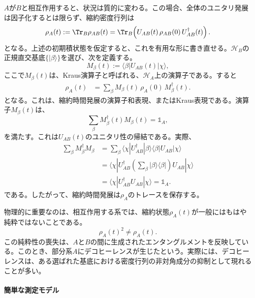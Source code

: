\documentclass[a4paper,11pt,oneside]{article}
\theoremstyle{definition}
\numberwithin{equation}{section}
\begin{document}
$A$が$B$と相互作用すると、状況は質的に変わる。この場合、全体のユニタリ発展は因子化するとは限らず、縮約密度行列は
\begin{equation}
\rho_A(t)
:=
\Tr_B \rho_{AB}(t)
=
\Tr_B\!\left(U_{AB}(t)\,\rho_{AB}(0)\,U_{AB}^\dagger(t)\right) .
\end{equation}
となる。上述の初期積状態を仮定すると、これを有用な形に書き直せる。$\mathcal H_B$の正規直交基底$\{|\beta\rangle\}$を選び、次を定義する。
\begin{equation}\label{def:kraus}
M_\beta(t) := \langle \beta|U_{AB}(t)|\chi\rangle ,
\end{equation}
ここで$M_\beta(t)$は、Kraus演算子と呼ばれる、$\mathcal H_A$上の演算子である。すると
\begin{align}\label{Krausoperatorrepresentation}
\rho_A(t)
&=
\sum_\beta
M_\beta(t)\,\rho_A(0)\,M_\beta^\dagger(t) .
\end{align}
となる。これは、縮約時間発展の演算子和表現、またはKraus表現である。演算子$M_\beta(t)$は、
\begin{equation}
\sum_\beta M_\beta^\dagger(t) M_\beta(t) = \mathds{1} _A ,
\end{equation}
を満たす。これは$U_{AB}(t)$のユニタリ性の帰結である。実際、
\begin{align}
\sum_\beta M_\beta^\dagger M_\beta
&=
\sum_\beta
\langle \chi|U_{AB}^\dagger|\beta\rangle
\langle \beta|U_{AB}|\chi\rangle
\nonumber\\
&=
\langle \chi|U_{AB}^\dagger
\left(\sum_\beta |\beta\rangle\langle\beta|\right)
U_{AB}|\chi\rangle
\nonumber\\
&=
\langle \chi|U_{AB}^\dagger U_{AB}|\chi\rangle =\mathds{1} _A .
\end{align}
である。したがって、縮約時間発展は$\rho_A$のトレースを保存する。



物理的に重要なのは、相互作用する系では、縮約状態$\rho_A(t)$が一般にはもはや純粋ではないことである。
\begin{equation}
\rho_A(t)^2 \neq \rho_A(t) .
\end{equation}
この純粋性の喪失は、$A$と$B$の間に生成されたエンタングルメントを反映している。このとき、部分系$A$にデコヒーレンスが生じたという。実際には、デコヒーレンスは、ある選ばれた基底における密度行列の非対角成分の抑制として現れることが多い。



\paragraph{簡単な測定モデル}
\end{document}
